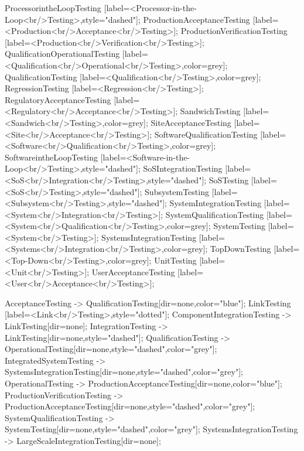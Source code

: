 \documentclass{article}
\begin{document}
{ProcessorintheLoopTesting [label=<Processor-in-the-Loop<br/>Testing>,style="dashed"];
ProductionAcceptanceTesting [label=<Production<br/>Acceptance<br/>Testing>];
ProductionVerificationTesting [label=<Production<br/>Verification<br/>Testing>];
QualificationOperationalTesting [label=<Qualification<br/>Operational<br/>Testing>,color=grey];
QualificationTesting [label=<Qualification<br/>Testing>,color=grey];
RegressionTesting [label=<Regression<br/>Testing>];
RegulatoryAcceptanceTesting [label=<Regulatory<br/>Acceptance<br/>Testing>];
SandwichTesting [label=<Sandwich<br/>Testing>,color=grey];
SiteAcceptanceTesting [label=<Site<br/>Acceptance<br/>Testing>];
SoftwareQualificationTesting [label=<Software<br/>Qualification<br/>Testing>,color=grey];
SoftwareintheLoopTesting [label=<Software-in-the-Loop<br/>Testing>,style="dashed"];
SoSIntegrationTesting [label=<SoS<br/>Integration<br/>Testing>,style="dashed"];
SoSTesting [label=<SoS<br/>Testing>,style="dashed"];
SubsystemTesting [label=<Subsystem<br/>Testing>,style="dashed"];
SystemIntegrationTesting [label=<System<br/>Integration<br/>Testing>];
SystemQualificationTesting [label=<System<br/>Qualification<br/>Testing>,color=grey];
SystemTesting [label=<System<br/>Testing>];
SystemsIntegrationTesting [label=<Systems<br/>Integration<br/>Testing>,color=grey];
TopDownTesting [label=<Top-Down<br/>Testing>,color=grey];
UnitTesting [label=<Unit<br/>Testing>];
UserAcceptanceTesting [label=<User<br/>Acceptance<br/>Testing>];

AcceptanceTesting -> QualificationTesting[dir=none,color="blue"];
LinkTesting [label=<Link<br/>Testing>,style="dotted"];
ComponentIntegrationTesting -> LinkTesting[dir=none];
IntegrationTesting -> LinkTesting[dir=none,style="dashed"];
QualificationTesting -> OperationalTesting[dir=none,style="dashed",color="grey"];
IntegratedSystemTesting -> SystemsIntegrationTesting[dir=none,style="dashed",color="grey"];
OperationalTesting -> ProductionAcceptanceTesting[dir=none,color="blue"];
ProductionVerificationTesting -> ProductionAcceptanceTesting[dir=none,style="dashed",color="grey"];
SystemQualificationTesting -> SystemTesting[dir=none,style="dashed",color="grey"];
SystemsIntegrationTesting -> LargeScaleIntegrationTesting[dir=none];

}
\end{document}
